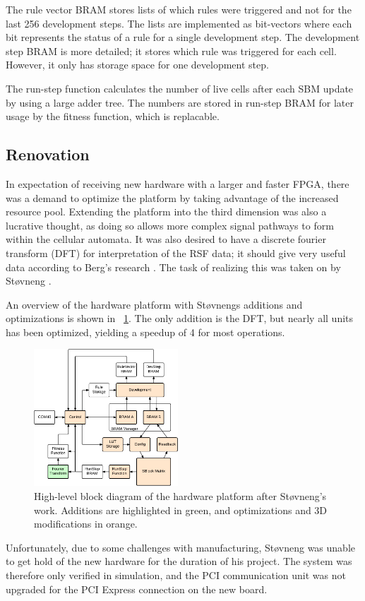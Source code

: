 The rule vector BRAM stores lists of which rules were triggered and not for the last 256 development steps.
The lists are implemented as bit-vectors where each bit represents the status of a rule for a single development step.
The development step BRAM is more detailed; it stores which rule was triggered for each cell.
However, it only has storage space for one development step.

The run-step function calculates the number of live cells after each SBM update by using a large adder tree.
The numbers are stored in run-step BRAM for later usage by the fitness function, which is replacable.

\subsection{Renovation}

In expectation of receiving new hardware with a larger and faster FPGA, there was a demand to optimize the platform by taking advantage of the increased resource pool.
Extending the platform into the third dimension was also a lucrative thought, as doing so allows more complex signal pathways to form within the cellular automata.
It was also desired to have a discrete fourier transform (DFT) for interpretation of the RSF data; it should give very useful data according to Berg's research \cite{berg2013ca}.
The task of realizing this was taken on by Støvneng \cite{stovneng2014sblock}.

An overview of the hardware platform with Støvnengs additions and optimizations is shown in \figurename~\ref{fig:overview-stovneng}.
The only addition is the DFT, but nearly all units has been optimized, yielding a speedup of 4 for most operations.

\begin{figure}[!ht]
    \centering
    \includegraphics[width=0.48\textwidth]{figures/overview-stovneng}
    \caption{High-level block diagram of the hardware platform after Støvneng's work. Additions are highlighted in green, and optimizations and 3D modifications in orange.}
    \label{fig:overview-stovneng}
\end{figure}

Unfortunately, due to some challenges with manufacturing, Støvneng was unable to get hold of the new hardware for the duration of his project.
The system was therefore only verified in simulation, and the PCI communication unit was not upgraded for the PCI Express connection on the new board.

